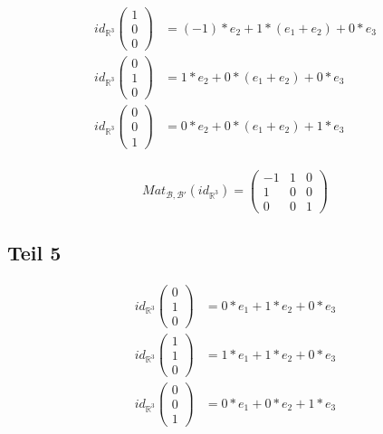 \documentclass[a4paper,10pt]{article}
\begin{document}
\begin{align*}
 id_{\mathbb{R}^3}\begin{pmatrix}1\\0\\0\end{pmatrix} & = (-1) * e_2 + 1 * (e_1 + e_2) + 0 * e_3\\
 id_{\mathbb{R}^3}\begin{pmatrix}0\\1\\0\end{pmatrix} & = 1 * e_2 + 0 * (e_1 + e_2) + 0 * e_3\\
 id_{\mathbb{R}^3}\begin{pmatrix}0\\0\\1\end{pmatrix} & = 0 * e_2 + 0 * (e_1 + e_2) + 1 * e_3\\
\end{align*}

\begin{equation}
 Mat_{\mathcal{B},\mathcal{B}'}(id_{\mathbb{R}^3}) =
  \begin{pmatrix}
   -1 & 1 & 0\\
   1 & 0 & 0\\
   0 & 0 & 1
  \end{pmatrix}
\end{equation}

\subsection*{Teil 5}

\begin{align*}
 id_{\mathbb{R}^3}\begin{pmatrix}0\\1\\0\end{pmatrix} & = 0 * e_1 + 1 * e_2 + 0 * e_3\\
 id_{\mathbb{R}^3}\begin{pmatrix}1\\1\\0\end{pmatrix} & = 1 * e_1 + 1 * e_2 + 0 * e_3\\
 id_{\mathbb{R}^3}\begin{pmatrix}0\\0\\1\end{pmatrix} & = 0 * e_1 + 0 * e_2 + 1 * e_3\\
\end{align*}
\end{document}
